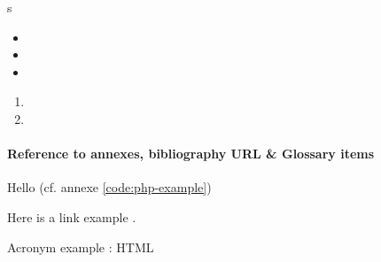 \lipsum

s
\begin{itemize}
	\item \lipsum[5]
	\item \lipsum[5]
	\item \lipsum[5]
\end{itemize}


\begin{enumerate}
	\item \lipsum[4]
	\item \lipsum[4]
\end{enumerate}

\paragraph*{Reference to annexes, bibliography URL \& Glossary items}

	Hello (cf. annexe \ref{code:php-example})
	
	Here is a link example .
	
	Acronym example : \gls{HTML}


